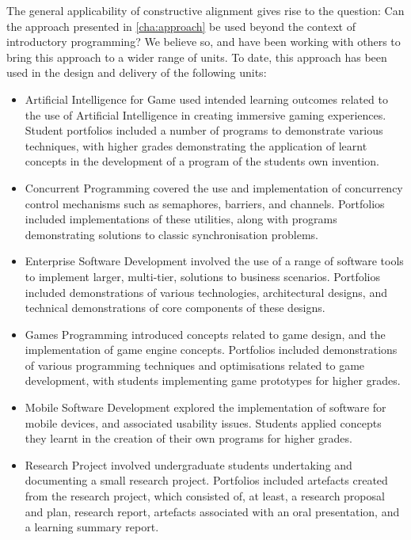 
The general applicability of constructive alignment gives rise to the question: Can the approach presented in \cref{cha:approach} be used beyond the context of introductory programming? We believe so, and have been working with others to bring this approach to a wider range of units. To date, this approach has been used in the design and delivery of the following units:

\begin{itemize}[noitemsep,nolistsep]
	\item Artificial Intelligence for Game used intended learning outcomes related to the use of Artificial Intelligence in creating immersive gaming experiences. Student portfolios included a number of programs to demonstrate various techniques, with higher grades demonstrating the application of learnt concepts in the development of a program of the students own invention.
	\item Concurrent Programming covered the use and implementation of concurrency control mechanisms such as semaphores, barriers, and channels. Portfolios included implementations of these utilities, along with programs demonstrating solutions to classic synchronisation problems.   
	\item Enterprise Software Development involved the use of a range of software tools to implement larger, multi-tier, solutions to business scenarios. Portfolios included demonstrations of various technologies, architectural designs, and technical demonstrations of core components of these designs.
	\item Games Programming introduced concepts related to game design, and the implementation of game engine concepts. Portfolios included demonstrations of various programming techniques and optimisations related to game development, with students implementing game prototypes for higher grades.
	\item Mobile Software Development explored the implementation of software for mobile devices, and associated usability issues. Students applied concepts they learnt in the creation of their own programs for higher grades.
	\item Research Project involved undergraduate students undertaking and documenting a small research project. Portfolios included artefacts created from the research project, which consisted of, at least, a research proposal and plan, research report, artefacts associated with an oral presentation, and a learning summary report. 
\end{itemize}

